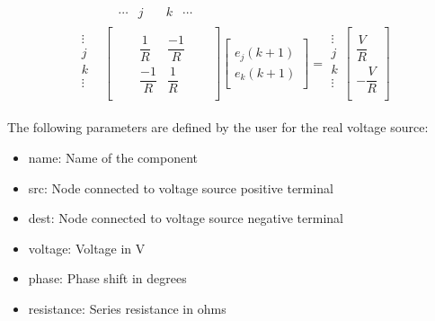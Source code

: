 \begin{align}
\begin{split}
&
\begin{matrix}
& \cdots & j & \quad k & \cdots
\end{matrix}\\[-6pt]
\begin{matrix}
\vdots\\[6pt]
j\\[6pt]
k\\[6pt]
\vdots\\
\end{matrix}
&
\begin{bmatrix}
	\quad & \quad &  \\[6pt]
	\quad & \dfrac{1}{R} & \dfrac{-1}{R} & \quad  \\[6pt]
	\quad & \dfrac{-1}{R} & \dfrac{1}{R} & \quad \\[6pt]
	\quad &  & 
\end{bmatrix}
\begin{bmatrix}
	\quad \\[6pt]
	e_j(k+1)\\[6pt]
	e_k(k+1)\\[6pt]
	\quad
\end{bmatrix}
=
\begin{matrix}
\vdots\\[6pt]
j\\[6pt]
k\\[6pt]
\vdots\\
\end{matrix}
\begin{bmatrix}
	\quad \\[6pt]
	\dfrac{V}{R} \\[6pt]
	-\dfrac{V}{R} \\[6pt]
	\quad
\end{bmatrix}
\end{split}
\end{align}

The following parameters are defined by the user for the real voltage source:

\begin{itemize}
\item name: Name of the component
\item src: Node connected to voltage source positive terminal
\item dest: Node connected to voltage source negative terminal
\item voltage: Voltage in V
\item phase: Phase shift in degrees
\item resistance: Series resistance in ohms 
\end{itemize}

